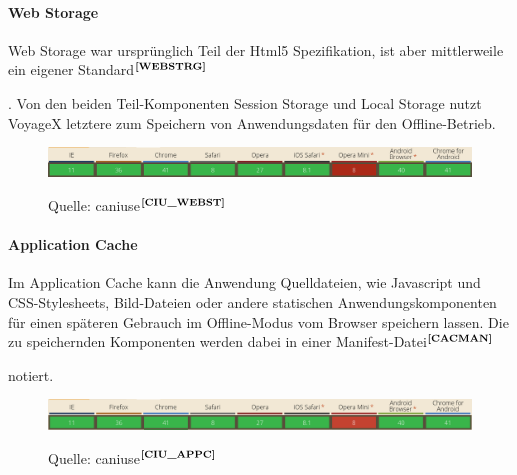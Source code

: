 \paragraph{Web Storage}
Web Storage war ursprünglich Teil der Html5 Spezifikation, ist aber mittlerweile ein eigener Standard$^{\textbf{\ref{WEBSTRG}}}$%
\addtocounter{footnote}{1}%
. Von den beiden Teil-Komponenten Session Storage und Local Storage nutzt VoyageX letztere zum Speichern von Anwendungsdaten für den Offline-Betrieb.
  \begin{figure}[H]
  \begin{adjustwidth}{-1.5cm}{1.5cm}
      \centering
	  \includegraphics[scale=0.6]{bilder/screenshots/caniuse_webstorage.png}\\ 
  	  \caption{Quelle: caniuse$^{\textbf{\ref{CIU_WEBST}}}$}
  \end{adjustwidth}
  \end{figure}
\addtocounter{footnote}{1}%

\paragraph{Application Cache}
Im Application Cache kann die Anwendung Quelldateien, wie Javascript und CSS-Stylesheets, Bild-Dateien oder andere statischen Anwendungskomponenten für einen späteren Gebrauch im Offline-Modus vom Browser speichern lassen. Die zu speichernden Komponenten werden dabei in einer Manifest-Datei$^{\textbf{\ref{CACMAN}}}$%
\addtocounter{footnote}{1}%
notiert. 
  \begin{figure}[H]
  \begin{adjustwidth}{-1.5cm}{1.5cm}
      \centering
	  \includegraphics[scale=0.6]{bilder/screenshots/caniuse_appcache.png}\\ 
  	  \caption{Quelle: caniuse$^{\textbf{\ref{CIU_APPC}}}$}
  \end{adjustwidth}
  \end{figure}
\addtocounter{footnote}{1}%

